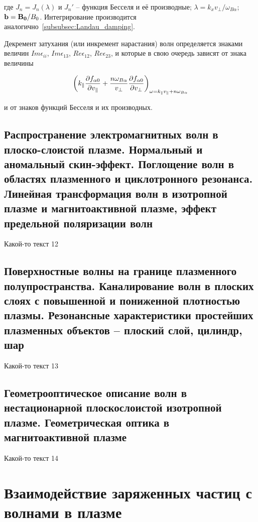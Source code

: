 \documentclass[10pt, a4paper]{article}
\let\stdsection\section
\renewcommand\section{\newpage\stdsection}
\begin{document}
где $J_n = J_n(\lambda)$ и $J_n'$ -- функция Бесселя и её производные; $\lambda = k_xv_\perp/\omega_{B\alpha}$; $\vb{b}=\vb{B_0}/B_0$. Интегрирование производится аналогично~\ref{subsubsec:Landau_damping}.

Декремент затухания (или инкремент нарастания) волн определяется знаками величин $Im\epsilon_{ii}$, $Im\epsilon_{13}$, $Re\epsilon_{12}$, $Re\epsilon_{23}$, и которые в свою очередь зависят от знака величины

\begin{equation*}
	\left(k_\parallel\pdv{f_{\alpha 0}}{v_\parallel}+\frac{n\omega_{B\alpha}}{v_\perp}\pdv{f_{\alpha 0}}{v_\perp}\right)_{\omega=k_\parallel v_\parallel+n\omega_{B\alpha}} 
\end{equation*}

и от знаков функций Бесселя и их производных.

\subsection{Распространение электромагнитных волн в плоско-слоистой плазме. Нормальный и аномальный скин-эффект. Поглощение волн в областях плазменного и циклотронного резонанса. Линейная трансформация волн в изотропной плазме и магнитоактивной плазме, эффект предельной поляризации волн}

Какой-то текст 12

\subsection{Поверхностные волны на границе плазменного полупространства. Каналирование волн в плоских слоях с повышенной и пониженной плотностью плазмы. Резонансные характеристики простейших плазменных объектов – плоский слой, цилиндр, шар}

Какой-то текст 13

\subsection{Геометрооптическое описание волн в нестационарной плоскослоистой изотропной плазме. Геометрическая оптика в магнитоактивной плазме}

Какой-то текст 14

\section{Взаимодействие заряженных частиц с волнами в плазме}
\end{document}
